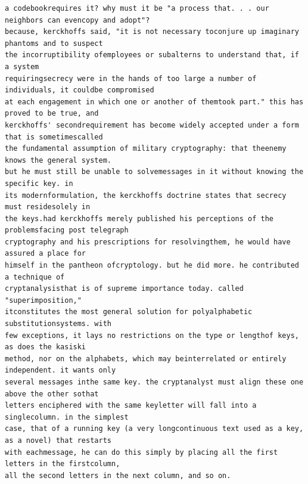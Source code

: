 \documentclass[12pt,a4paper]{article}
\begin{document}
\begin{lstlisting}[caption={Fully Decrypted Plaintext (Variant 19)}]
a codebookrequires it? why must it be "a process that. . . our neighbors can evencopy and adopt"? 
because, kerckhoffs said, "it is not necessary toconjure up imaginary phantoms and to suspect 
the incorruptibility ofemployees or subalterns to understand that, if a system 
requiringsecrecy were in the hands of too large a number of individuals, it couldbe compromised 
at each engagement in which one or another of themtook part." this has proved to be true, and 
kerckhoffs' secondrequirement has become widely accepted under a form that is sometimescalled 
the fundamental assumption of military cryptography: that theenemy knows the general system. 
but he must still be unable to solvemessages in it without knowing the specific key. in 
its modernformulation, the kerckhoffs doctrine states that secrecy must residesolely in 
the keys.had kerckhoffs merely published his perceptions of the problemsfacing post telegraph 
cryptography and his prescriptions for resolvingthem, he would have assured a place for 
himself in the pantheon ofcryptology. but he did more. he contributed a technique of 
cryptanalysisthat is of supreme importance today. called "superimposition," 
itconstitutes the most general solution for polyalphabetic substitutionsystems. with 
few exceptions, it lays no restrictions on the type or lengthof keys, as does the kasiski 
method, nor on the alphabets, which may beinterrelated or entirely independent. it wants only 
several messages inthe same key. the cryptanalyst must align these one above the other sothat 
letters enciphered with the same keyletter will fall into a singlecolumn. in the simplest 
case, that of a running key (a very longcontinuous text used as a key, as a novel) that restarts 
with eachmessage, he can do this simply by placing all the first letters in the firstcolumn, 
all the second letters in the next column, and so on.
\end{lstlisting}


\end{document}
